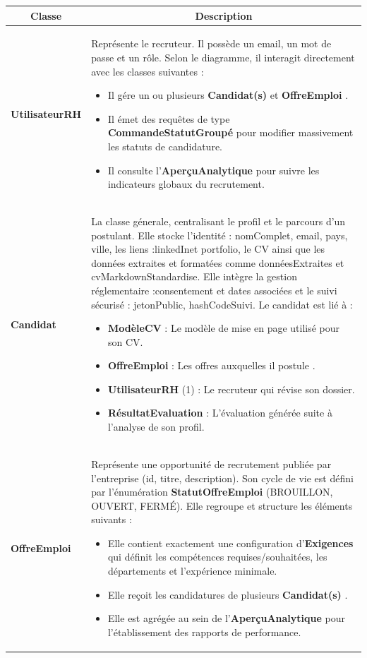 \documentclass[12pt,a4paper,oneside]{report}
\begin{document}
\begin{itemize}
\begin{longtable}{|p{}|p{}|}
\hline
\multicolumn{1}{|c|}{\textbf{Classe}} & \multicolumn{1}{c|}{\textbf{Description}} \\
\hline
\endhead
\textbf{UtilisateurRH} & Représente le recruteur. Il possède un email, un mot de passe et un rôle. Selon le diagramme, il interagit directement avec les classes suivantes : \begin{itemize} \item Il gére un ou plusieurs \textbf{Candidat(s)} et \textbf{OffreEmploi} 
. \item Il émet des requêtes de type \textbf{CommandeStatutGroupé} pour modifier massivement les statuts de candidature. \item Il consulte l'\textbf{AperçuAnalytique} pour suivre les indicateurs globaux du recrutement. \end{itemize} \\
\hline
\textbf{Candidat} & La classe génerale, centralisant le profil et le parcours d'un postulant. Elle stocke l'identité : nomComplet, email, pays, ville, les liens :linkedInet portfolio, le CV ainsi que les données extraites et formatées comme donnéesExtraites et cvMarkdownStandardise. Elle intègre la gestion réglementaire :consentement et dates associées et le suivi sécurisé : jetonPublic, hashCodeSuivi. Le candidat est lié à : \begin{itemize} \item \textbf{ModèleCV} : Le modèle de mise en page utilisé pour son CV. \item \textbf{OffreEmploi} : Les offres auxquelles il postule . \item \textbf{UtilisateurRH} (1) : Le recruteur qui révise son dossier. \item \textbf{RésultatEvaluation} : L'évaluation générée suite à l'analyse de son profil. \end{itemize} \\
\hline
\textbf{OffreEmploi} & Représente une opportunité de recrutement publiée par l'entreprise (id, titre, description). Son cycle de vie est défini par l'énumération \textbf{StatutOffreEmploi} (BROUILLON, OUVERT, FERMÉ). Elle regroupe et structure les éléments suivants : \begin{itemize} \item Elle contient exactement une configuration d'\textbf{Exigences}  qui définit les compétences requises/souhaitées, les départements et l'expérience minimale. \item Elle reçoit les candidatures de plusieurs \textbf{Candidat(s)} . \item Elle est agrégée au sein de l'\textbf{AperçuAnalytique} pour l'établissement des rapports de performance. \end{itemize} \\

\end{longtable}
\end{itemize}
\end{document}
